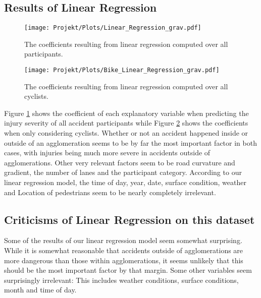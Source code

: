 \documentclass{article}
\begin{document}
\subsection{Results of Linear Regression}

\begin{figure}
  \centering
  \texttt{[image: Projekt/Plots/Linear\_Regression\_grav.pdf]}
  \caption{The coefficients resulting from linear regression computed over all participants.}
  \label{plot:regression_all}
\end{figure}

\begin{figure}
  \centering
  \texttt{[image: Projekt/Plots/Bike\_Linear\_Regression\_grav.pdf]}
  \caption{The coefficients resulting from linear regression computed over all cyclists.}
  \label{plot:regression_bikes}
\end{figure}

Figure \ref{plot:regression_all} shows the coefficient of each explanatory variable when predicting the injury severity of all accident participants while Figure \ref{plot:regression_bikes} shows the coefficients when only considering cyclists. Whether or not an accident happened inside or outside of an agglomeration seems to be by far the most important factor in both cases, with injuries being much more severe in accidents outside of agglomerations. Other very relevant factors seem to be road curvature and gradient, the number of lanes and the participant category. According to our linear regression model, the time of day, year, date, surface condition, weather and Location of pedestrians seem to be nearly completely irrelevant.

\subsection{Criticisms of Linear Regression on this dataset}

Some of the results of our linear regression model seem somewhat surprising. While it is somewhat reasonable that accidents outside of agglomerations are more dangerous than those within agglomerations, it seems unlikely that this should be the most important factor by that margin. Some other variables seem surprisingly irrelevant: This includes weather conditions, surface conditions, month and time of day.\\
\end{document}
